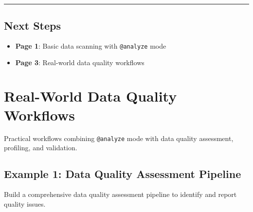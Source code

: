 \documentclass[
  letterpaper,
]{scrbook}
\providecommand{\tightlist}{%
  \setlength{\itemsep}{0pt}\setlength{\parskip}{0pt}}
\begin{document}
\begin{center}\rule{0.5\linewidth}{0.5pt}\end{center}

\section{Next Steps}\label{next-steps-17}

\begin{itemize}
\tightlist
\item
  \textbf{Page 1}: Basic data scanning with \texttt{@analyze} mode
\item
  \textbf{Page 3}: Real-world data quality workflows
\end{itemize}

\chapter{Real-World Data Quality
Workflows}\label{real-world-data-quality-workflows}

Practical workflows combining \texttt{@analyze} mode with data quality
assessment, profiling, and validation.

\section{Example 1: Data Quality Assessment
Pipeline}\label{example-1-data-quality-assessment-pipeline}

Build a comprehensive data quality assessment pipeline to identify and
report quality issues.
\end{document}

